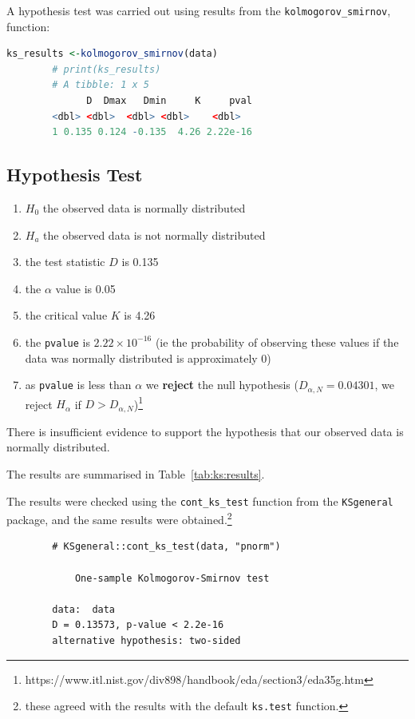 \documentclass[12pt,letterpaper]{article}
\begin{document}
	A hypothesis test was carried out using results from the \texttt{kolmogorov\_smirnov}, function:

	\begin{lstlisting}[language=R]
		ks_results <-kolmogorov_smirnov(data)
		# print(ks_results)
		# A tibble: 1 x 5
		      D  Dmax   Dmin     K     pval
  		<dbl> <dbl>  <dbl> <dbl>    <dbl>
		1 0.135 0.124 -0.135  4.26 2.22e-16
	\end{lstlisting}

	\subsection*{Hypothesis Test}

	\begin{enumerate}
		\item $H_0$ the observed data is normally distributed
		\item $H_a$ the observed data is not normally distributed
		\item the test statistic $D$ is 0.135
		\item the $\alpha$ value is 0.05
		\item the critical value $K$ is 4.26
		\item the \texttt{pvalue} is $2.22 \times 10^{-16}$ (ie the probability of observing these values if the data was normally distributed is approximately 0)
		\item as \texttt{pvalue} is less than $\alpha$ we \textbf{reject} the null hypothesis
		($D_{\alpha,N}=0.04301$, we reject $H_\alpha$ if $D > D_{\alpha,N}$)\footnote{https://www.itl.nist.gov/div898/handbook/eda/section3/eda35g.htm}
	\end{enumerate}

	There is insufficient evidence to support the hypothesis that our observed data is normally distributed.

  The results are summarised in Table~\ref{tab:ks:results}.

	The results were checked using the \texttt{cont\_ks\_test} function from the \texttt{KSgeneral} package, and the same results were obtained.\footnote{these agreed with the results with the default \texttt{ks.test} function.}
  \begin{lstlisting}
		# KSgeneral::cont_ks_test(data, "pnorm")

			One-sample Kolmogorov-Smirnov test

		data:  data
		D = 0.13573, p-value < 2.2e-16
		alternative hypothesis: two-sided
\end{lstlisting}
\end{document}
